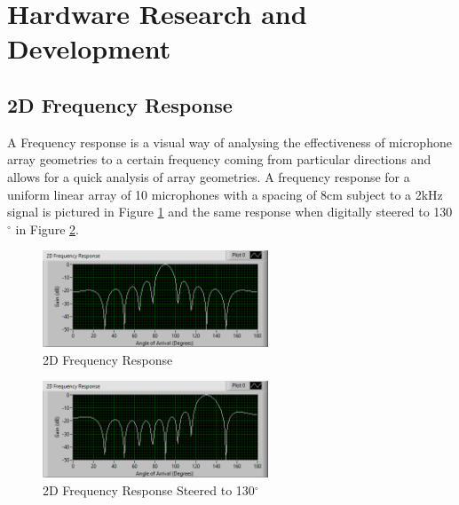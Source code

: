 \documentclass{UoNMCHA}
\numberwithin{equation}{section}
\begin{document}
\newpage
\section{Hardware Research and Development} \label{sec:Hardware}
\subsection{2D Frequency Response} \label{sec:2D Freq Response}
    A Frequency response is a visual way of analysing the effectiveness of microphone array geometries to a certain frequency coming from particular directions and allows for a quick analysis of array geometries. A frequency response for a uniform linear array of 10 microphones with a spacing of $8$cm subject to a 2kHz signal is pictured in Figure \ref{fig:2DFreqResponseLin} and the same response when digitally steered to 130$^{\circ}$ in Figure \ref{fig:2DResponseSteered}.
    
    \begin{figure}[H]
        \centering
        \includegraphics[keepaspectratio, width = 0.6\textwidth]{Figures/FrequencyResponse2K10Lin.png}
        \caption{2D Frequency Response}
        \label{fig:2DFreqResponseLin}
    \end{figure}
    \begin{figure}[H]
        \centering
        \includegraphics[keepaspectratio, width = 0.6\textwidth]{Figures/2DResponseSteered.png}
        \caption{2D Frequency Response Steered to 130$^{\circ}$}
        \label{fig:2DResponseSteered}
    \end{figure}
    
\end{document}

